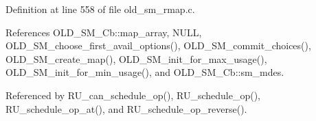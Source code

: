 Definition at line 558 of file old\_\-sm\_\-rmap.c.

References OLD\_\-SM\_\-Cb::map\_\-array, NULL, OLD\_\-SM\_\-choose\_\-first\_\-avail\_\-options(), OLD\_\-SM\_\-commit\_\-choices(), OLD\_\-SM\_\-create\_\-map(), OLD\_\-SM\_\-init\_\-for\_\-max\_\-usage(), OLD\_\-SM\_\-init\_\-for\_\-min\_\-usage(), and OLD\_\-SM\_\-Cb::sm\_\-mdes.

Referenced by RU\_\-can\_\-schedule\_\-op(), RU\_\-schedule\_\-op(), RU\_\-schedule\_\-op\_\-at(), and RU\_\-schedule\_\-op\_\-reverse().